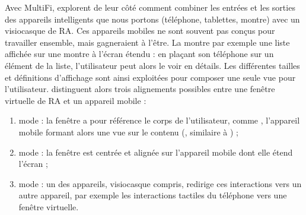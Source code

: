 
Avec MultiFi, \cite{Grubert2015} explorent de leur côté comment combiner les entrées et les sorties des appareils intelligents que nous portons (téléphone, tablettes, montre) avec un visiocasque de RA. Ces appareils mobiles ne sont souvent pas conçus pour travailler ensemble, mais gagneraient à l'être. La  montre par exemple une liste affichée sur une montre à l'écran étendu : en plaçant son téléphone sur un élément de la liste, l'utilisateur peut alors le voir en détails. Les différentes tailles et définitions d'affichage sont ainsi exploitées pour composer une seule vue pour l'utilisateur. \citeauthor{Grubert2015} distinguent alors trois alignements possibles entre une fenêtre virtuelle de RA et un appareil mobile  :
\begin{enumerate}
  \item mode  : la fenêtre a pour référence le corps de l'utilisateur, comme \cite{Ens2014}, l'appareil mobile formant alors une vue  sur le contenu (, similaire à \cite{Berge2014}) ;
  \item mode  : la fenêtre est centrée et alignée sur l'appareil mobile dont elle étend l'écran  ;
  \item mode  : un des appareils, visiocasque compris, redirige ces interactions vers un autre appareil, par exemple les interactions tactiles du téléphone vers une fenêtre virtuelle.
\end{enumerate}
\medskip



